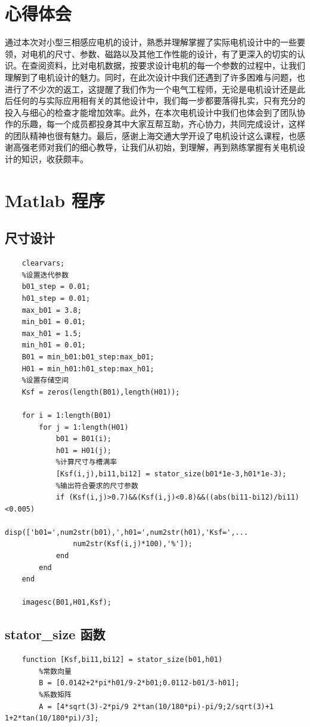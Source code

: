 \documentclass[a4paper,11pt]{ctexart}
\begin{document}
\begin{spacing}{1.5}
\begin{table}[h]
\end{table}

\section*{心得体会}
\par
通过本次对小型三相感应电机的设计，熟悉并理解掌握了实际电机设计中的一些要领，对电机的尺寸、参数、磁路以及其他工作性能的设计，有了更深入的切实的认识。在查阅资料，比对电机数据，按要求设计电机的每一个参数的过程中，让我们理解到了电机设计的魅力。同时，在此次设计中我们还遇到了许多困难与问题，也进行了不少次的返工，这提醒了我们作为一个电气工程师，无论是电机设计还是此后任何的与实际应用相有关的其他设计中，我们每一步都要落得扎实，只有充分的投入与细心的检查才能增加效率。此外，在本次电机设计中我们也体会到了团队协作的乐趣，每一个成员都投身其中大家互帮互助，齐心协力，共同完成设计，这样的团队精神也很有魅力。最后，感谢上海交通大学开设了电机设计这么课程，也感谢高强老师对我们的细心教导，让我们从初始，到理解，再到熟练掌握有关电机设计的知识，收获颇丰。

\section*{Matlab 程序}

\subsection{尺寸设计}\label{code:S}
\vspace{-4em}
\begin{lstlisting}
	clearvars;
	%设置迭代参数
	b01_step = 0.01;
	h01_step = 0.01;
	max_b01 = 3.8;
	min_b01 = 0.01;
	max_h01 = 1.5;
	min_h01 = 0.01;
	B01 = min_b01:b01_step:max_b01;
	H01 = min_h01:h01_step:max_h01;
	%设置存储空间
	Ksf = zeros(length(B01),length(H01));
	
	for i = 1:length(B01)
		for j = 1:length(H01)
			b01 = B01(i);
			h01 = H01(j);
			%计算尺寸与槽满率
			[Ksf(i,j),bi11,bi12] = stator_size(b01*1e-3,h01*1e-3);
			%输出符合要求的尺寸参数
			if (Ksf(i,j)>0.7)&&(Ksf(i,j)<0.8)&&((abs(bi11-bi12)/bi11)<0.005)
				disp(['b01=',num2str(b01),',h01=',num2str(h01),'Ksf=',...
				num2str(Ksf(i,j)*100),'%']);
			end
		end
	end
	
	imagesc(B01,H01,Ksf);
\end{lstlisting}
\vspace{2em}
\subsection{stator\_size 函数}
\vspace{-4em}
\begin{lstlisting}
	function [Ksf,bi11,bi12] = stator_size(b01,h01)
		%常数向量
		B = [0.0142+2*pi*h01/9-2*b01;0.0112-b01/3-h01];
		%系数矩阵
		A = [4*sqrt(3)-2*pi/9 2*tan(10/180*pi)-pi/9;2/sqrt(3)+1 1+2*tan(10/180*pi)/3];
	

\end{lstlisting}
\end{spacing}
\end{document}
